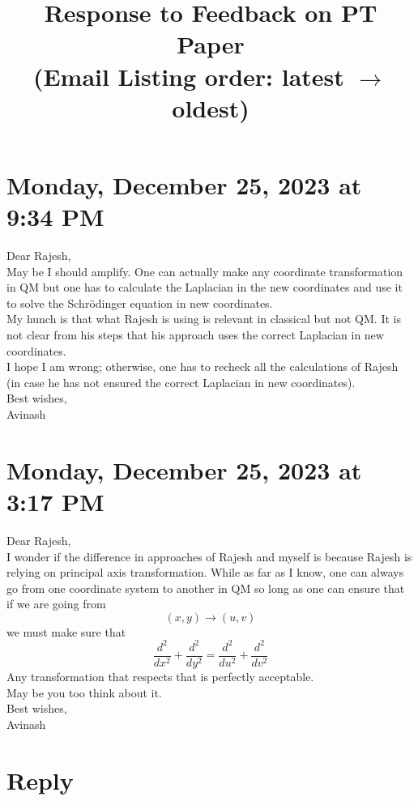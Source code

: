 \documentclass[a4paper, 12pt]{article}
\title{Response to Feedback on PT Paper\\\small{(Email Listing order: latest $\rightarrow$ oldest)}}
\author{}
\date{}
\begin{document}
\maketitle

\section*{Monday, December 25, 2023 at 9:34 PM}

Dear Rajesh,\\
\indent May be I should amplify. One can actually make any coordinate transformation in QM but one has to calculate the Laplacian in the new coordinates and use it to solve the Schrödinger equation in new coordinates.\\

My hunch is that what Rajesh is using is relevant in classical but not QM. It is not clear from his steps that his approach uses the correct Laplacian in new coordinates.\\

I hope I am wrong; otherwise, one has to recheck all the calculations of Rajesh (in case he has not ensured the correct Laplacian in new coordinates).\\

Best wishes,\\
Avinash




\section*{Monday, December 25, 2023 at 3:17 PM}

Dear Rajesh,\\
\indent I wonder if the difference in approaches of Rajesh and myself is because Rajesh is relying on principal axis transformation. While as far as I know, one can always go from one coordinate system to another in QM so long as one can ensure that if we are going from\\
\[
(x, y) \to (u, v)
\]
we must make sure that
\[
\frac{d^2}{dx^2} + \frac{d^2}{dy^2} = \frac{d^2}{du^2} + \frac{d^2}{dv^2}
\]
Any transformation that respects that is perfectly acceptable.\\

May be you too think about it.\\

Best wishes,\\
Avinash
\section*{Reply}
\end{document}
